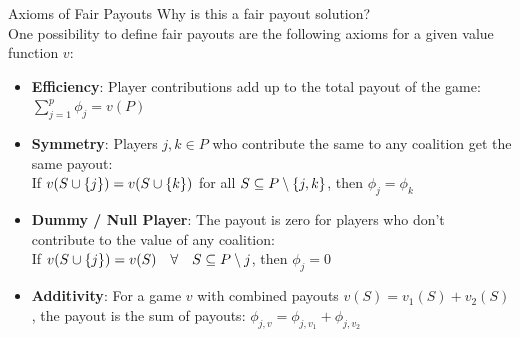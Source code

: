 \documentclass[11pt,compress,t,notes=noshow, aspectratio=169, xcolor=table]{beamer}
\begin{document}
\begin{vbframe}{Axioms of Fair Payouts}
 Why is this a fair payout solution?
 \\
 One possibility to define fair payouts are the following axioms for a given value function $v$:
  \vspace{0.25cm}
  \begin{itemize}
  \itemsep1em
    \item \textbf{Efficiency}: Player contributions add up to the total payout of the game:
      $\sum\nolimits_{j=1}^p\phi_j = v(P)$
    \item \textbf{Symmetry}: Players $j,k \in P$ who contribute the same to any coalition get the same payout: \\
      If $v(\Scupj) = v(\Scupk)$ for all $\SsubP \setminus\{j,k\}$, then $\phi_j=\phi_k$
    \item \textbf{Dummy / Null Player}: The payout is zero for players who don't contribute to the value of any coalition: \\
      If $v(\Scupj)=v(S)\quad  \forall \quad \SsubP \setminus j$, then $\phi_j=0$
    \item \textbf{Additivity}: For a game $v$ with combined payouts $v(S) = v_1(S) + v_2(S)$, the payout is the sum of payouts: $\phi_{j,v} = \phi_{j,v_1} + \phi_{j, v_2}$
  \end{itemize}
  \vspace{0.5cm}
  

\end{vbframe}




\end{document}
